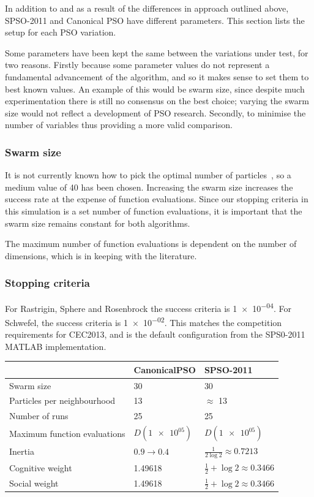 \documentclass{csfourzero}
\begin{document}
In addition to and as a result of the differences in approach outlined above,
SPSO-2011 and Canonical PSO have different parameters.  This section lists the
setup for each PSO variation.

Some parameters have been kept the same between the variations under test, for
two reasons. Firstly because some parameter values do not represent a
fundamental advancement of the algorithm, and so it makes sense to set them to
best known values. An example of this would be swarm size, since despite much
experimentation there is still no consensus on the best choice; varying the
swarm size would not reflect a development of PSO research. Secondly, to
minimise the number of variables thus providing a more valid comparison.

\subsubsection{Swarm size}

It is not currently known how to pick the optimal number of
particles~\cite{Trelea:2003dv}, so a medium value of 40 has been chosen.
Increasing the swarm size increases the success rate at the expense of function
evaluations. Since our stopping criteria in this simulation is a set number of
function evaluations, it is important that the swarm size remains constant for
both algorithms.

The maximum number of function evaluations is dependent on the number of
dimensions, which is in keeping with the literature.

\subsubsection{Stopping criteria}

For Rastrigin, Sphere and Rosenbrock the success criteria is \num{1e-04}. For
Schwefel, the success criteria is \num{1e-02}. This matches the competition
requirements for CEC2013, and is the default configuration from the SPS0-2011
MATLAB implementation.

\begin{table}
  \begin{tabular}{lll}
  \hline
  ~                            & CanonicalPSO         & SPSO-2011 \\ \hline
  Swarm size                   & 30                    & 30 \\
  Particles per neighbourhood  & 13                    & $\approx$ 13 \\
  Number of runs               & 25                    & 25 \\
  Maximum function evaluations & $D(\num{1e+05})$      & $D(\num{1e+05})$ \\
  Inertia                      & $0.9 \rightarrow 0.4$ & $\frac{1}{2\log{2}} \approx 0.7213$ \\
  Cognitive weight             & 1.49618               & $\frac{1}{2} + \log{2} \approx 0.3466$ \\
  Social weight                & 1.49618               & $\frac{1}{2} + \log{2} \approx 0.3466$ \\
  \end{tabular}
\end{table}
\end{document}
